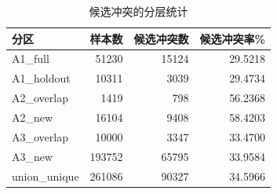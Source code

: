 \begin{table}[htbp]\centering
\caption{候选冲突的分层统计}\label{tab:q1_conflict_coverage}
\begin{tabular}{lrrr}
\toprule
分区 & 样本数 & 候选冲突数 & 候选冲突率\% \\
\midrule
A1\_full & 51230 & 15124 & 29.5218 \\
A1\_holdout & 10311 & 3039 & 29.4734 \\
A2\_overlap & 1419 & 798 & 56.2368 \\
A2\_new & 16104 & 9408 & 58.4203 \\
A3\_overlap & 10000 & 3347 & 33.4700 \\
A3\_new & 193752 & 65795 & 33.9584 \\
union\_unique & 261086 & 90327 & 34.5966 \\
\bottomrule\end{tabular}\end{table}
